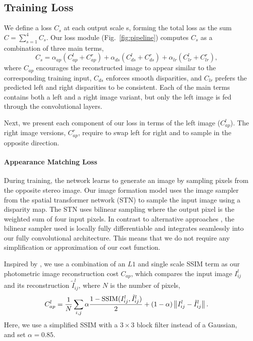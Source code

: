 \documentclass[10pt,twocolumn,letterpaper]{article}
\begin{document}
\subsection{Training Loss}
We define a loss $C_s$ at each output scale s, forming the total loss as the sum $C = \sum_{s=1}^4 C_s$.
Our loss module (Fig.~\ref{fig:pipeline}) computes $C_s$ as a combination of three main terms, 
\begin{equation}
C_s = \alpha_{ap} (C_{ap}^l + C_{ap}^r) + \alpha_{ds} (C_{ds}^l + C_{ds}^r) + \alpha_{lr} (C_{lr}^l + C_{lr}^r),
\label{eq:cs}
\end{equation}
where $C_{ap}$ encourages the reconstructed image to appear similar to the corresponding training input, $C_{ds}$ enforces smooth disparities, and $C_{lr}$ prefers the predicted left and right disparities to be consistent. Each of the main terms contains both a left and a right image variant, but only the left image is fed through the convolutional layers. 

Next, we present each component of our loss in terms of the left image (\eg $C_{ap}^l$). The right image versions, \eg $C_{ap}^r$, require to swap left for right and to sample in the opposite direction.

\paragraph*{Appearance Matching Loss}
During training, the network learns to generate an image by sampling pixels from the opposite stereo image. 
Our image formation model uses the image sampler from the spatial transformer network (STN) \cite{jaderberg2015spatial} to sample the input image using a disparity map. 
The STN uses bilinear sampling where the output pixel is the weighted sum of four input pixels. 
In contrast to alternative approaches \cite{garg2016unsupervised,xie2016deep3d}, the bilinear sampler used is locally fully differentiable and integrates seamlessly into our fully convolutional architecture.
This means that we do not require any simplification or approximation of our cost function.

Inspired by \cite{lossfunctions}, we use a combination of an $L1$ and single scale SSIM \cite{wang2004image} term as our photometric image reconstruction cost $C_{ap}$, which compares the input image $I^l_{ij}$ and its reconstruction $\tilde{I}^l_{ij}$, where $N$ is the number of pixels,
\begin{equation}C_{ap}^l = \frac{1}{N} \sum_{i,j} \alpha \frac{1 - \textup{SSIM}(I^l_{ij}, \tilde{I}^l_{ij})}{2} + (1-\alpha)\left \| I^l_{ij} - \tilde{I}^l_{ij} \right \|.
\label{eq:ca}
\end{equation}
Here, we use a simplified SSIM with a $3\times3$ block filter instead of a Gaussian, and set $\alpha = 0.85$.
\end{document}

